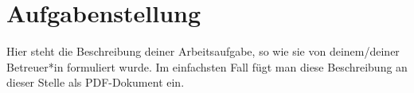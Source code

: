 

\section*{Aufgabenstellung}
Hier steht die Beschreibung deiner Arbeitsaufgabe, so wie sie von deinem/deiner Betreuer*in formuliert wurde. Im einfachsten Fall fügt man diese Beschreibung an dieser Stelle als PDF-Dokument ein.

%
